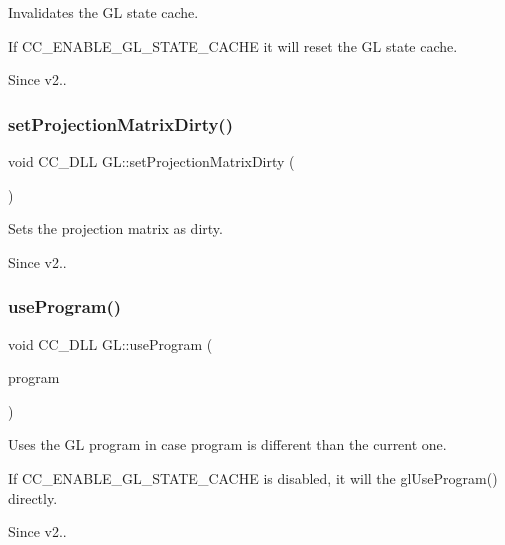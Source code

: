 Invalidates the GL state cache.

If C\+C\+\_\+\+E\+N\+A\+B\+L\+E\+\_\+\+G\+L\+\_\+\+S\+T\+A\+T\+E\+\_\+\+C\+A\+C\+HE it will reset the GL state cache. \begin{DoxySince}{Since}
v2.. 
\end{DoxySince}
\mbox{\label{group__renderer_ga76bea3d67ff1576fa108c8fc32a4e34d}} 
\subsubsection{\texorpdfstring{set\+Projection\+Matrix\+Dirty()}{setProjectionMatrixDirty()}}
{\footnotesize\ttfamily void C\+C\+\_\+\+D\+LL G\+L\+::set\+Projection\+Matrix\+Dirty (\begin{DoxyParamCaption}\item[{void}]{ }\end{DoxyParamCaption})}

Sets the projection matrix as dirty. \begin{DoxySince}{Since}
v2.. 
\end{DoxySince}
\mbox{\label{group__renderer_ga9a278fd0f2e0e04afd32de3995fcf791}} 
\subsubsection{\texorpdfstring{use\+Program()}{useProgram()}}
{\footnotesize\ttfamily void C\+C\+\_\+\+D\+LL G\+L\+::use\+Program (\begin{DoxyParamCaption}\item[{G\+Luint}]{program }\end{DoxyParamCaption})}

Uses the GL program in case program is different than the current one.

If C\+C\+\_\+\+E\+N\+A\+B\+L\+E\+\_\+\+G\+L\+\_\+\+S\+T\+A\+T\+E\+\_\+\+C\+A\+C\+HE is disabled, it will the gl\+Use\+Program() directly. \begin{DoxySince}{Since}
v2.. 
\end{DoxySince}
